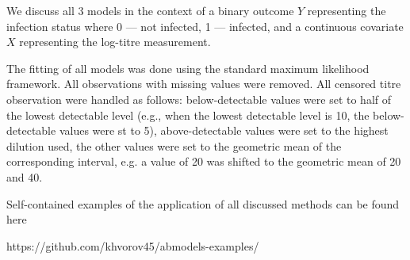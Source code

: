 We discuss all 3 models in the context of a binary outcome $Y$ representing the infection status where 0 --- not infected, 1 --- infected, and a continuous covariate $X$ representing the log-titre measurement.

The fitting of all models was done using the standard maximum likelihood framework. All observations with missing values were removed. All censored titre observation were handled as follows: below-detectable values were set to half of the lowest detectable level (e.g., when the lowest detectable level is 10, the below-detectable values were st to 5), above-detectable values were set to the highest dilution used, the other values were set to the geometric mean of the corresponding interval, e.g. a value of 20 was shifted to the geometric mean of 20 and 40.

Self-contained examples of the application of all discussed methods can be found here

https://github.com/khvorov45/abmodels-examples/
